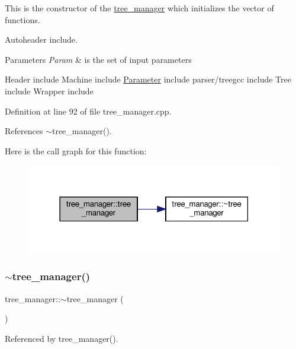 This is the constructor of the \hyperlink{classtree__manager}{tree\+\_\+manager} which initializes the vector of functions. 

Autoheader include.


\begin{DoxyParams}{Parameters}
{\em Param} & is the set of input parameters\\
\hline
\end{DoxyParams}
Header include Machine include \hyperlink{classParameter}{Parameter} include parser/treegcc include Tree include Wrapper include 

Definition at line 92 of file tree\+\_\+manager.\+cpp.



References $\sim$tree\+\_\+manager().

Here is the call graph for this function\+:
\nopagebreak
\begin{figure}[H]
\begin{center}
\leavevmode
\includegraphics[width=318pt]{d2/ddd/classtree__manager_ad534a11d39d51b9d41f35a6c40cafe13_cgraph}
\end{center}
\end{figure}
\mbox{\label{classtree__manager_aa1d84289bfb70f965da1a12446fd947f}} 
\subsubsection{\texorpdfstring{$\sim$tree\+\_\+manager()}{~tree\_manager()}}
{\footnotesize\ttfamily tree\+\_\+manager\+::$\sim$tree\+\_\+manager (\begin{DoxyParamCaption}{ }\end{DoxyParamCaption})\hspace{0.3cm}{\ttfamily [default]}}



Referenced by tree\+\_\+manager().

